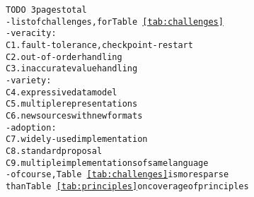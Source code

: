 \begin{alltt}TODO\scriptsize ~3 pages total
- list of challenges, for Table~\ref{tab:challenges}
  - veracity:
    C1. fault-tolerance, checkpoint-restart
    C2. out-of-order handling
    C3. inaccurate value handling
  - variety:
    C4. expressive data model
    C5. multiple representations
    C6. new sources with new formats
  - adoption:
    C7. widely-used implementation
    C8. standard proposal
    C9. multiple implementations of same language
- of course, Table~\ref{tab:challenges} is more sparse
  than Table~\ref{tab:principles} on coverage of principles
\end{alltt}
